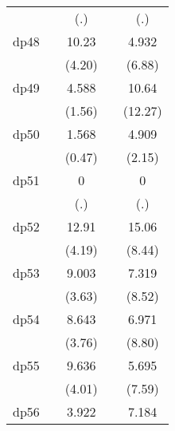 {\begin{tabular}{l*{4}{c}}
            &                     &         (.)         &                     &         (.)         \\
[1em]
dp48        &                     &       10.23\sym{***}&                     &       4.932\sym{***}\\
            &                     &      (4.20)         &                     &      (6.88)         \\
[1em]
dp49        &                     &       4.588         &                     &       10.64\sym{***}\\
            &                     &      (1.56)         &                     &     (12.27)         \\
[1em]
dp50        &                     &       1.568         &                     &       4.909\sym{*}  \\
            &                     &      (0.47)         &                     &      (2.15)         \\
[1em]
dp51        &                     &           0         &                     &           0         \\
            &                     &         (.)         &                     &         (.)         \\
[1em]
dp52        &                     &       12.91\sym{***}&                     &       15.06\sym{***}\\
            &                     &      (4.19)         &                     &      (8.44)         \\
[1em]
dp53        &                     &       9.003\sym{***}&                     &       7.319\sym{***}\\
            &                     &      (3.63)         &                     &      (8.52)         \\
[1em]
dp54        &                     &       8.643\sym{***}&                     &       6.971\sym{***}\\
            &                     &      (3.76)         &                     &      (8.80)         \\
[1em]
dp55        &                     &       9.636\sym{***}&                     &       5.695\sym{***}\\
            &                     &      (4.01)         &                     &      (7.59)         \\
[1em]
dp56        &                     &       3.922         &                     &       7.184\sym{**} \\

\end{tabular}}
